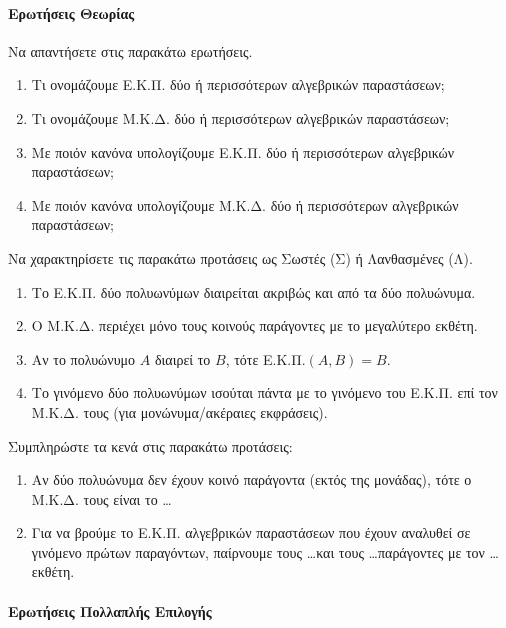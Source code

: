 \documentclass[11pt,a4paper,modern]{FFExercises}
\begin{document}

\paragraph{Ερωτήσεις Θεωρίας}

\askhsh
Να απαντήσετε στις παρακάτω ερωτήσεις.
\begin{enumerate}[label=\roman*.]
    \item Τι ονομάζουμε Ε.Κ.Π. δύο ή περισσότερων αλγεβρικών παραστάσεων;
    \item Τι ονομάζουμε Μ.Κ.Δ. δύο ή περισσότερων αλγεβρικών παραστάσεων;
    \item Με ποιόν κανόνα υπολογίζουμε Ε.Κ.Π. δύο ή περισσότερων αλγεβρικών παραστάσεων;
    \item Με ποιόν κανόνα υπολογίζουμε Μ.Κ.Δ. δύο ή περισσότερων αλγεβρικών παραστάσεων;
\end{enumerate}

\askhsh
Να χαρακτηρίσετε τις παρακάτω προτάσεις ως Σωστές (Σ) ή Λανθασμένες (Λ).
\begin{enumerate}[label=\roman*.]
    \item Το Ε.Κ.Π. δύο πολυωνύμων διαιρείται ακριβώς και από τα δύο πολυώνυμα.
    \item Ο Μ.Κ.Δ. περιέχει μόνο τους κοινούς παράγοντες με το μεγαλύτερο εκθέτη.
    \item Αν το πολυώνυμο $A$ διαιρεί το $B$, τότε Ε.Κ.Π.$(A, B) = B$.
    \item Το γινόμενο δύο πολυωνύμων ισούται πάντα με το γινόμενο του Ε.Κ.Π. επί τον Μ.Κ.Δ. τους (για μονώνυμα/ακέραιες εκφράσεις).
\end{enumerate}

\askhsh
Συμπληρώστε τα κενά στις παρακάτω προτάσεις:
\begin{enumerate}[label=\roman*.]
    \item Αν δύο πολυώνυμα δεν έχουν κοινό παράγοντα (εκτός της μονάδας), τότε ο Μ.Κ.Δ. τους είναι το \dots
    \item Για να βρούμε το Ε.Κ.Π. αλγεβρικών παραστάσεων που έχουν αναλυθεί σε γινόμενο πρώτων παραγόντων, παίρνουμε τους \dots και τους \dots παράγοντες με τον \dots εκθέτη.
\end{enumerate}

\paragraph{Ερωτήσεις Πολλαπλής Επιλογής}
\end{document}
